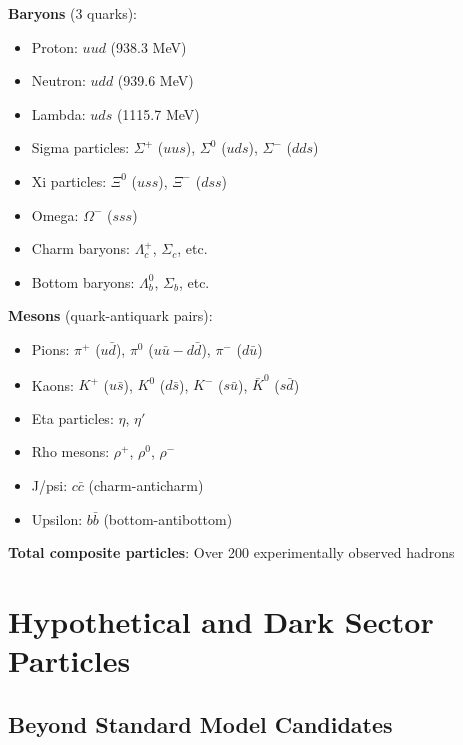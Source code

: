 	\textbf{Baryons} (3 quarks):
	\begin{itemize}
		\item Proton: $uud$ (938.3 MeV)
		\item Neutron: $udd$ (939.6 MeV)
		\item Lambda: $uds$ (1115.7 MeV)
		\item Sigma particles: $\Sigma^+$ ($uus$), $\Sigma^0$ ($uds$), $\Sigma^-$ ($dds$)
		\item Xi particles: $\Xi^0$ ($uss$), $\Xi^-$ ($dss$)
		\item Omega: $\Omega^-$ ($sss$)
		\item Charm baryons: $\Lambda_c^+$, $\Sigma_c$, etc.
		\item Bottom baryons: $\Lambda_b^0$, $\Sigma_b$, etc.
	\end{itemize}
	
	\textbf{Mesons} (quark-antiquark pairs):
	\begin{itemize}
		\item Pions: $\pi^+$ ($u\bar{d}$), $\pi^0$ ($u\bar{u} - d\bar{d}$), $\pi^-$ ($d\bar{u}$)
		\item Kaons: $K^+$ ($u\bar{s}$), $K^0$ ($d\bar{s}$), $K^-$ ($s\bar{u}$), $\bar{K}^0$ ($s\bar{d}$)
		\item Eta particles: $\eta$, $\eta'$
		\item Rho mesons: $\rho^+$, $\rho^0$, $\rho^-$
		\item J/psi: $c\bar{c}$ (charm-anticharm)
		\item Upsilon: $b\bar{b}$ (bottom-antibottom)
	\end{itemize}
	
	\textbf{Total composite particles}: Over 200 experimentally observed hadrons
	
	\section{Hypothetical and Dark Sector Particles}
	
	\subsection{Beyond Standard Model Candidates}
	
